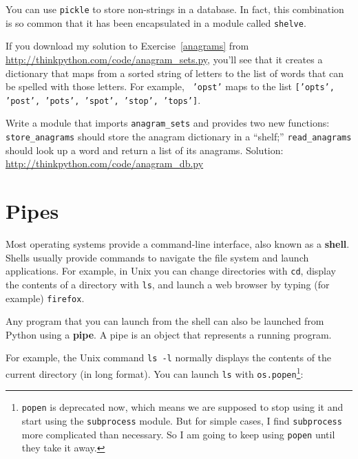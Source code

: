 \documentclass[10pt]{book}
\begin{document}
\begin{CJK}{UTF8}{gbsn}
You can use {\tt pickle} to store non-strings in a database.
In fact, this combination is so common that it has been
encapsulated in a module called {\tt shelve}.  


\begin{exercise}

If you download my solution to Exercise~\ref{anagrams} from
\url{http://thinkpython.com/code/anagram_sets.py}, you'll see that it creates
a dictionary that maps from a sorted string of letters to the list of
words that can be spelled with those letters.  For example, {\tt
  'opst'} maps to the list {\tt ['opts', 'post', 'pots', 'spot',
    'stop', 'tops']}.

Write a module that imports \verb"anagram_sets" and provides
two new functions: \verb"store_anagrams" should store the
anagram dictionary in a ``shelf;'' \verb"read_anagrams" should
look up a word and return a list of its anagrams.
Solution: \url{http://thinkpython.com/code/anagram_db.py}

\end{exercise}


\section{Pipes}

Most operating systems provide a command-line interface,
also known as a {\bf shell}.  Shells usually provide commands
to navigate the file system and launch applications.  For
example, in Unix you can change directories with {\tt cd},
display the contents of a directory with {\tt ls}, and launch
a web browser by typing (for example) {\tt firefox}.

Any program that you can launch from the shell can also be
launched from Python using a {\bf pipe}.  A pipe is an object
that represents a running program.

For example, the Unix command {\tt ls -l} normally displays the
contents of the current directory (in long format).  You can
launch {\tt ls} with {\tt os.popen}\footnote{{\tt popen} is deprecated
now, which means we are supposed to stop using it and start using
the {\tt subprocess} module.  But for simple cases, I find
{\tt subprocess} more complicated than necessary.  So I am going
to keep using {\tt popen} until they take it away.}:


\end{CJK}
\end{document}
